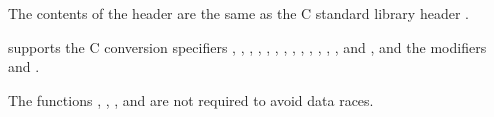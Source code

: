 \pnum
The contents of the header  are the same as the C standard library header .
\begin{footnote}
 supports the C conversion specifiers
, , , , , , ,
, , , , , , and
, and the modifiers  and .
\end{footnote}

\pnum
The functions , , , and
 are not required to avoid data
races.

